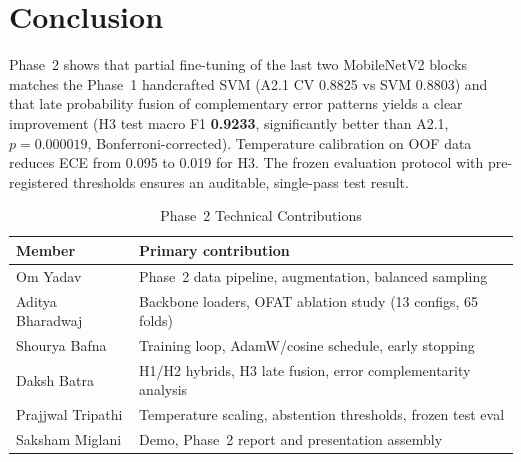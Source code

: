 \documentclass[conference]{IEEEtran}
\begin{document}
\section{Conclusion}
\label{sec:conc}
Phase~2 shows that partial fine-tuning of the last two MobileNetV2 blocks matches the Phase~1 handcrafted SVM (A2.1 CV 0.8825 vs SVM 0.8803) and that late probability fusion of complementary error patterns yields a clear improvement (H3 test macro F1 \textbf{0.9233}, significantly better than A2.1, $p=0.000019$, Bonferroni-corrected). Temperature calibration on OOF data reduces ECE from 0.095 to 0.019 for H3. The frozen evaluation protocol with pre-registered thresholds ensures an auditable, single-pass test result.

\balance



\begin{table}[t]\caption{Phase~2 Technical Contributions}\centering
\begin{tabular}{lp{5.2cm}}\toprule
Member & Primary contribution\\\midrule
Om Yadav & Phase~2 data pipeline, augmentation, balanced sampling\\
Aditya Bharadwaj & Backbone loaders, OFAT ablation study (13 configs, 65 folds)\\
Shourya Bafna & Training loop, AdamW/cosine schedule, early stopping\\
Daksh Batra & H1/H2 hybrids, H3 late fusion, error complementarity analysis\\
Prajjwal Tripathi & Temperature scaling, abstention thresholds, frozen test eval\\
Saksham Miglani & Demo, Phase~2 report and presentation assembly\\\bottomrule
\end{tabular}\end{table}
\end{document}
